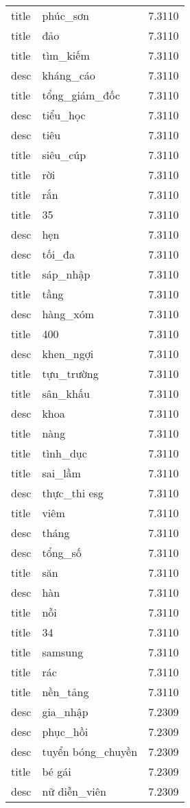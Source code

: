 \documentclass{article}
\begin{document}
\begin{tabular}{lll}
title & phúc\_sơn & 7.3110\\
title & đảo & 7.3110\\
title & tìm\_kiếm & 7.3110\\
desc & kháng\_cáo & 7.3110\\
title & tổng\_giám\_đốc & 7.3110\\
desc & tiểu\_học & 7.3110\\
desc & tiêu & 7.3110\\
title & siêu\_cúp & 7.3110\\
title & rời & 7.3110\\
title & rắn & 7.3110\\
title & 35 & 7.3110\\
desc & hẹn & 7.3110\\
desc & tối\_đa & 7.3110\\
title & sáp\_nhập & 7.3110\\
title & tầng & 7.3110\\
desc & hàng\_xóm & 7.3110\\
title & 400 & 7.3110\\
desc & khen\_ngợi & 7.3110\\
title & tựu\_trường & 7.3110\\
title & sân\_khấu & 7.3110\\
desc & khoa & 7.3110\\
title & nàng & 7.3110\\
title & tình\_dục & 7.3110\\
title & sai\_lầm & 7.3110\\
desc & thực\_thi esg & 7.3110\\
title & viêm & 7.3110\\
desc & tháng & 7.3110\\
desc & tổng\_số & 7.3110\\
title & săn & 7.3110\\
desc & hàn & 7.3110\\
title & nỗi & 7.3110\\
title & 34 & 7.3110\\
title & samsung & 7.3110\\
title & rác & 7.3110\\
title & nền\_tảng & 7.3110\\
desc & gia\_nhập & 7.2309\\
desc & phục\_hồi & 7.2309\\
desc & tuyển bóng\_chuyền & 7.2309\\
title & bé gái & 7.2309\\
desc & nữ diễn\_viên & 7.2309\\

\end{tabular}
\end{document}
